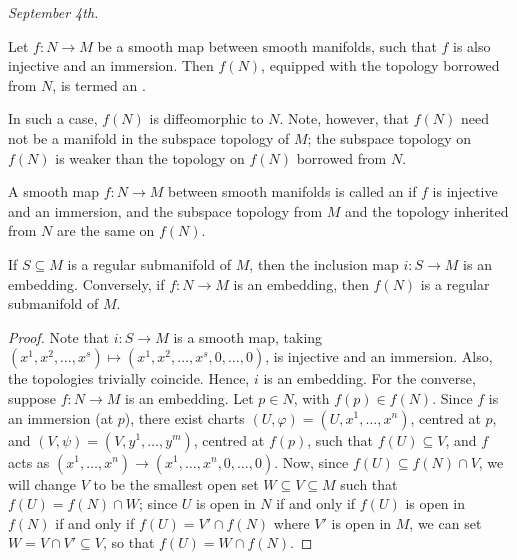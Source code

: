 \textit{September 4th.}
\begin{definition}
    Let $f:N \to M$ be a smooth map between smooth manifolds, such that $f$ is also injective and an immersion. Then $f(N)$, equipped with the topology borrowed from $N$, is termed an .
\end{definition}
In such a case, $f(N)$ is diffeomorphic to $N$. Note, however, that $f(N)$ need not be a manifold in the subspace topology of $M$; the subspace topology on $f(N)$ is weaker than the topology on $f(N)$ borrowed from $N$.

\begin{definition}
    A smooth map $f:N \to M$ between smooth manifolds is called an  if $f$ is injective and an immersion, and the subspace topology from $M$ and the topology inherited from $N$ are the same on $f(N)$.
\end{definition}

\begin{theorem}
    If $S \subseteq M$ is a regular submanifold of $M$, then the inclusion map $i:S \to M$ is an embedding. Conversely, if $f:N \to M$ is an embedding, then $f(N)$ is a regular submanifold of $M$.
\end{theorem}
\begin{proof}
    Note that $i:S \to M$ is a smooth map, taking $(x^{1},x^{2},\ldots,x^{s}) \mapsto (x^{1},x^{2},\ldots,x^{s},0,\ldots,0)$, is injective and an immersion. Also, the topologies trivially coincide. Hence, $i$ is an embedding. For the converse, suppose $f:N \to M$ is an embedding. Let $p \in N$, with $f(p) \in f(N)$. Since $f$ is an immersion (at $p$), there exist charts $(U,\varphi) = (U,x^{1},\ldots,x^{n})$, centred at $p$, and $(V,\psi) = (V,y^{1},\ldots,y^{m})$, centred at $f(p)$, such that $f(U) \subseteq V$, and $f$ acts as $(x^{1},\ldots,x^{n}) \to (x^{1},\ldots,x^{n},0,\ldots,0)$. Now, since $f(U) \subseteq f(N) \cap V$, we will change $V$ to be the smallest open set $W \subseteq V \subseteq M$ such that $f(U) = f(N) \cap W$; since $U$ is open in $N$ if and only if $f(U)$ is open in $f(N)$ if and only if $f(U) = V' \cap f(N)$ where $V'$ is open in $M$, we can set $W = V \cap V' \subseteq V$, so that $f(U) = W \cap f(N)$.
\end{proof}

